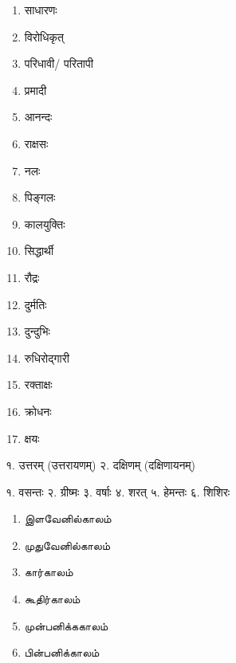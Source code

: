 \begin{multicols}{3}
\begin{enumerate}
    \item साधारणः
    \item विरोधिकृत्
    \item परिधावी/ परितापी
    \item प्रमादी
    \item आनन्दः
    \item राक्षसः
    \item नलः
    \item पिङ्गलः
    \item कालयुक्तिः
    \item सिद्धार्थी
    \item रौद्रः
    \item दुर्मतिः
    \item दुन्दुभिः
    \item रुधिरोद्गारी
    \item रक्ताक्षः
    \item क्रोधनः
    \item क्षयः
  \end{enumerate}
\end{multicols}

१. उत्तरम् (उत्तरायणम्)\hspace{2em}
२. दक्षिणम् (दक्षिणायनम्)



१. वसन्तः २. ग्रीष्मः
३. वर्षाः ४. शरत्
५. हेमन्तः ६. शिशिरः

\tamfamily
{}
\nopagebreak[4]

\begin{multicols}{2}
  \renewcommand{\labelenumi}{\theenumi.}
  \begin{enumerate}\itemsep-1ex
    \item இளவேனில்காலம்
    \item  முதுவேனில்காலம்
    \item  கார்காலம்
    \item  கூதிர்காலம்
    \item  முன்பனிக்ககாலம்
    \item  பின்பனிக்காலம்
  \end{enumerate}
\end{multicols}

\dngfamily


